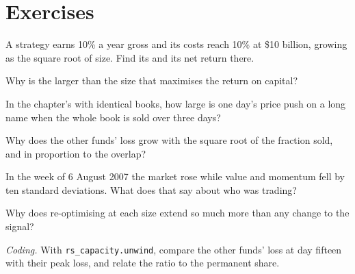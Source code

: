 \section{Exercises}

\begin{exercise}[$\star$]\label{exo:rs:capacity-decay-and-crowding:1}
A strategy earns 10\% a year gross and its costs reach 10\% at \$10 billion, growing as the square root of size. Find its  and its net return
there.
\end{exercise}

\begin{exercise}[$\star$]\label{exo:rs:capacity-decay-and-crowding:2}
Why is the  larger than the size that maximises the return on capital?
\end{exercise}

\begin{exercise}[$\star$]\label{exo:rs:capacity-decay-and-crowding:3}
In the chapter's  with identical books, how large is one day's price push on a long name when the whole book is sold over three days?
\end{exercise}

\begin{exercise}[$\star\star$]\label{exo:rs:capacity-decay-and-crowding:4}
Why does the other funds' loss grow with the square root of the fraction sold, and in proportion to the overlap?
\end{exercise}

\begin{exercise}[$\star\star$]\label{exo:rs:capacity-decay-and-crowding:5}
In the week of 6 August 2007 the market rose while value and momentum fell by ten standard deviations. What does that say about who was trading?
\end{exercise}

\begin{exercise}[$\star\star$]\label{exo:rs:capacity-decay-and-crowding:6}
Why does re-optimising at each size extend  so much more than any change to the signal?
\end{exercise}

\begin{exercise}[$\star\star\star$]\label{exo:rs:capacity-decay-and-crowding:7}
\emph{Coding.} With \texttt{rs\_capacity.unwind}, compare the other funds' loss at day fifteen with their peak loss, and relate the ratio to the permanent share.
\end{exercise}

